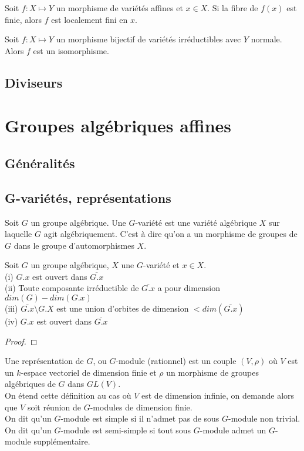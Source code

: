 \begin{prop}
Soit $f:X \mapsto Y$ un morphisme de variétés affines et $x\in X$. Si la fibre de $f(x)$ est finie, alors $f$ est localement fini en $x$.
\end{prop}

\begin{thm}
Soit $f:X \mapsto Y$ un morphisme bijectif de variétés irréductibles avec $Y$ normale. Alors $f$ est un isomorphisme.
\end{thm}



\subsection{Diviseurs}


\section{Groupes algébriques affines}
\subsection{Généralités}
\subsection{G-variétés, représentations}

\begin{defn}[G-variété]
Soit $G$ un groupe algébrique. Une $G$-variété est une variété algébrique $X$ sur laquelle $G$ agit algébriquement. C'est à dire qu'on a un morphisme de groupes de $G$ dans le groupe d'automorphismes $X$.
\end{defn}

\begin{prop}
Soit $G$ un groupe algébrique, $X$ une $G$-variété et $x\in X$.\\
(i) $G.x$ est ouvert dans $\overline{G.x}$\\
(ii) Toute composante irréductible de $\overline{G.x}$ a pour dimension $dim (G)-dim(G.x)$\\
(iii) $\overline{G.x}\setminus G.X$ est une union d'orbites de dimension $<dim(\overline{G.x})$\\
(iv) $G.x$ est ouvert dans $\overline{G.x}$
\end{prop}
\begin{proof}

\end{proof}

\begin{defn}
Une représentation de $G$, ou $G$-module (rationnel) est un couple $(V, \rho)$ où $V$ est un $k$-espace vectoriel de dimension finie et $\rho$ un morphisme de groupes algébriques de $G$ dans $GL(V)$.\\
On étend cette définition au cas où $V$ est de dimension infinie, on demande alors que $V$ soit réunion de $G$-modules de dimension finie.\\
On dit qu'un $G$-module est simple si il n'admet pas de sous $G$-module non trivial. On dit qu'un $G$-module est semi-simple si tout sous $G$-module admet un $G$-module supplémentaire.
\end{defn}

